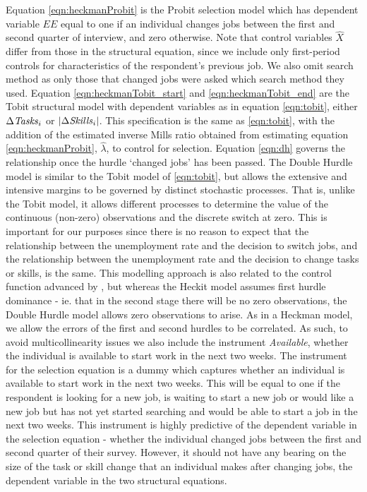 \documentclass[preprint,12pt,authoryear]{elsarticle}
\begin{document}
Equation \ref{eqn:heckmanProbit} is the Probit selection model which has dependent variable $EE$ equal to one if an individual changes jobs between the first and second quarter of interview, and zero otherwise. Note that control variables $\hat{X}$ differ from those in the structural equation, since we include only first-period controls for characteristics of the respondent's previous job. We also omit search method as only those that changed jobs were asked which search method they used.  Equation \ref{eqn:heckmanTobit_start} and  \ref{eqn:heckmanTobit_end} are the Tobit structural model with dependent variables as in equation \ref{eqn:tobit}, either $\Delta\text{\textit{Tasks}}_{i}$ or $|\Delta\text{\textit{Skills}}_{i}|$. This specification is the same as \ref{eqn:tobit}, with the addition of the estimated inverse Mills ratio obtained from estimating equation \ref{eqn:heckmanProbit}, $\hat{\lambda}$, to control for selection. Equation \ref{eqn:dh} governs the relationship once the hurdle `changed jobs' has been passed.  The Double Hurdle model is similar to the Tobit model of \ref{eqn:tobit}, but allows the extensive and intensive margins to be governed by distinct stochastic processes. That is, unlike the Tobit model, it allows different processes to determine the value of the continuous (non-zero) observations and the discrete switch at zero. This is important for our purposes since there is no reason to expect that the relationship between the unemployment rate and the decision to switch jobs, and the relationship between the unemployment rate and the decision to change tasks or skills, is the same. This modelling approach is also related to the control function advanced by \cite{Heckman}, but whereas the Heckit model assumes first hurdle dominance - ie. that in the second stage there will be no zero observations, the Double Hurdle model allows zero observations to arise. As in a Heckman model, we allow the errors of the first and second hurdles to be correlated. As such, to avoid multicollinearity issues we also include the instrument \textit{Available}, whether the individual is available to start work in the next two weeks. The instrument for the selection equation is a dummy which captures whether an individual is available to start work in the next two weeks. This will be equal to one if the respondent is looking for a new job, is waiting to start a new job or would like a new job but has not yet started searching and would be able to start a job in the next two weeks. This instrument is highly predictive of the dependent variable in the selection equation - whether the individual changed jobs between the first and second quarter of their survey. However, it should not have any bearing on the size of the task or skill change that an individual makes after changing jobs, the dependent variable in the two structural equations. 
\end{document}
